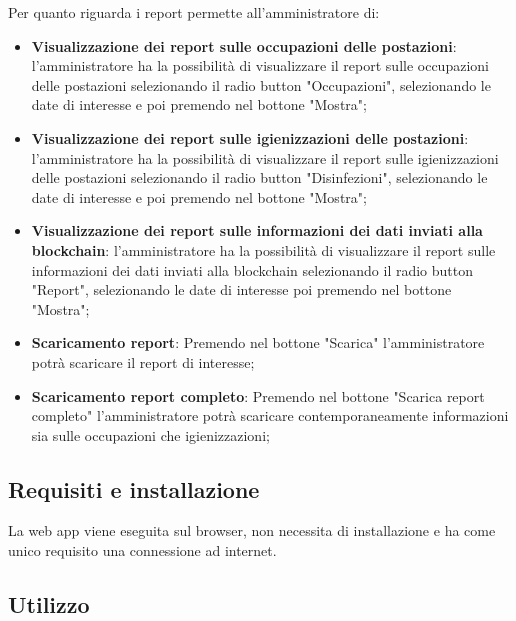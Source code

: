 Per quanto riguarda i report permette all'amministratore di:
\begin{itemize}
	\item \textbf{Visualizzazione dei report sulle occupazioni delle postazioni}: l'amministratore ha la possibilità di visualizzare il report sulle occupazioni delle postazioni selezionando il radio button "Occupazioni", selezionando le date di interesse e poi premendo nel bottone "Mostra"; \\
	\item \textbf{Visualizzazione dei report sulle igienizzazioni delle postazioni}: l'amministratore ha la possibilità di visualizzare il report sulle igienizzazioni delle postazioni selezionando il radio button "Disinfezioni", selezionando le date di interesse e poi premendo nel bottone "Mostra"; \\
	\item \textbf{Visualizzazione dei report sulle informazioni dei dati inviati alla blockchain}: l'amministratore ha la possibilità di visualizzare il report sulle informazioni dei dati inviati alla blockchain selezionando il radio button "Report", selezionando le date di interesse poi premendo nel bottone "Mostra"; \\
	\item \textbf{Scaricamento report}: Premendo nel bottone "Scarica" l'amministratore potrà scaricare il report di interesse; \\
	\item \textbf{Scaricamento report completo}:  Premendo nel bottone "Scarica report completo" l'amministratore potrà scaricare contemporaneamente informazioni sia sulle occupazioni che igienizzazioni; \\


\end{itemize}

\subsection{Requisiti e installazione}
La web app viene eseguita sul browser, non necessita di installazione e ha come unico requisito una connessione ad internet.

\subsection{Utilizzo}
